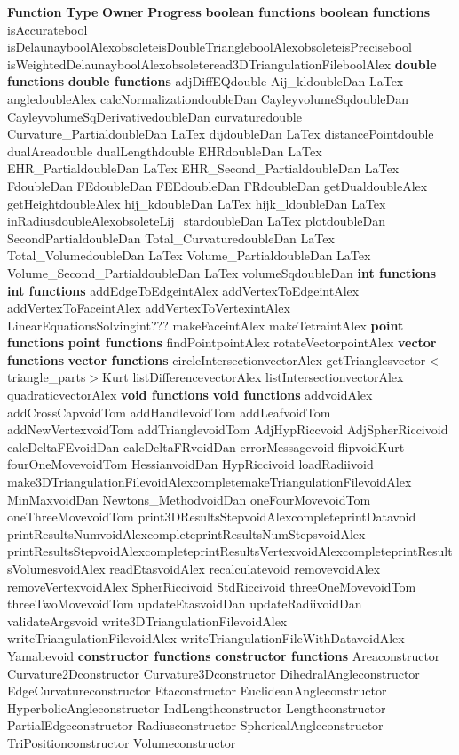 \documentclass[10pt]{article}%
\begin{document}
 \textbf{Function}  \textbf{Type}  \textbf{Owner}  \textbf{Progress}      \textbf{boolean functions}  \textbf{boolean functions}   isAccuratebool  isDelaunayboolAlexobsoleteisDoubleTriangleboolAlexobsoleteisPrecisebool  isWeightedDelaunayboolAlexobsoleteread3DTriangulationFileboolAlex      \textbf{double functions}  \textbf{double functions}   adjDiffEQdouble  Aij\_kldoubleDan LaTex angledoubleAlex calcNormalizationdoubleDan  CayleyvolumeSqdoubleDan  CayleyvolumeSqDerivativedoubleDan  curvaturedouble  Curvature\_PartialdoubleDan LaTex dijdoubleDan LaTex distancePointdouble  dualAreadouble  dualLengthdouble  EHRdoubleDan LaTex EHR\_PartialdoubleDan LaTex EHR\_Second\_PartialdoubleDan LaTex FdoubleDan  FEdoubleDan  FEEdoubleDan  FRdoubleDan  getDualdoubleAlex getHeightdoubleAlex hij\_kdoubleDan LaTex hijk\_ldoubleDan LaTex inRadiusdoubleAlexobsoleteLij\_stardoubleDan LaTex plotdoubleDan  SecondPartialdoubleDan  Total\_CurvaturedoubleDan LaTex Total\_VolumedoubleDan LaTex Volume\_PartialdoubleDan LaTex Volume\_Second\_PartialdoubleDan LaTex volumeSqdoubleDan       \textbf{int functions}  \textbf{int functions}   addEdgeToEdgeintAlex addVertexToEdgeintAlex addVertexToFaceintAlex addVertexToVertexintAlex LinearEquationsSolvingint???  makeFaceintAlex makeTetraintAlex      \textbf{point functions}  \textbf{point functions}   findPointpointAlex rotateVectorpointAlex      \textbf{vector functions}  \textbf{vector functions}   circleIntersectionvectorAlex getTrianglesvector\mbox{$<$}triangle\_parts\mbox{$>$}Kurt listDifferencevectorAlex listIntersectionvectorAlex quadraticvectorAlex      \textbf{void functions}  \textbf{void functions}   addvoidAlex addCrossCapvoidTom addHandlevoidTom addLeafvoidTom addNewVertexvoidTom addTrianglevoidTom AdjHypRiccvoid  AdjSpherRiccivoid  calcDeltaFEvoidDan  calcDeltaFRvoidDan  errorMessagevoid  flipvoidKurt fourOneMovevoidTom HessianvoidDan  HypRiccivoid  loadRadiivoid  make3DTriangulationFilevoidAlexcompletemakeTriangulationFilevoidAlex MinMaxvoidDan  Newtons\_MethodvoidDan  oneFourMovevoidTom oneThreeMovevoidTom print3DResultsStepvoidAlexcompleteprintDatavoid  printResultsNumvoidAlexcompleteprintResultsNumStepsvoidAlex printResultsStepvoidAlexcompleteprintResultsVertexvoidAlexcompleteprintResultsVolumesvoidAlex readEtasvoidAlex  recalculatevoid  removevoidAlex removeVertexvoidAlex SpherRiccivoid  StdRiccivoid  threeOneMovevoidTom threeTwoMovevoidTom updateEtasvoidDan  updateRadiivoidDan  validateArgsvoid  write3DTriangulationFilevoidAlex writeTriangulationFilevoidAlex writeTriangulationFileWithDatavoidAlex Yamabevoid       \textbf{constructor functions}  \textbf{constructor functions}   Areaconstructor  Curvature2Dconstructor  Curvature3Dconstructor  DihedralAngleconstructor  EdgeCurvatureconstructor  Etaconstructor  EuclideanAngleconstructor  HyperbolicAngleconstructor  IndLengthconstructor  Lengthconstructor  PartialEdgeconstructor  Radiusconstructor  SphericalAngleconstructor  TriPositionconstructor  Volumeconstructor  
    

%
\end{document}
